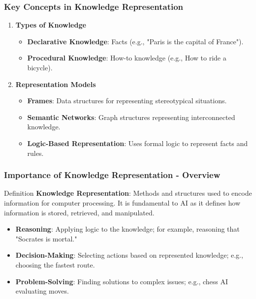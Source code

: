 \documentclass[aspectratio=169]{beamer}
\begin{document}
\begin{frame}[fragile]
    \frametitle{Key Concepts in Knowledge Representation}
    \begin{enumerate}
        \item \textbf{Types of Knowledge}
        \begin{itemize}
            \item \textbf{Declarative Knowledge}: Facts (e.g., "Paris is the capital of France").
            \item \textbf{Procedural Knowledge}: How-to knowledge (e.g., How to ride a bicycle).
        \end{itemize}
        \item \textbf{Representation Models}
        \begin{itemize}
            \item \textbf{Frames}: Data structures for representing stereotypical situations.
            \item \textbf{Semantic Networks}: Graph structures representing interconnected knowledge.
            \item \textbf{Logic-Based Representation}: Uses formal logic to represent facts and rules.
        \end{itemize}
    \end{enumerate}
\end{frame}

\begin{frame}[fragile]
    \frametitle{Importance of Knowledge Representation - Overview}
    \begin{block}{Definition}
        \textbf{Knowledge Representation}: Methods and structures used to encode information for computer processing. It is fundamental to AI as it defines how information is stored, retrieved, and manipulated.
    \end{block}
    \begin{itemize}
        \item \textbf{Reasoning}: Applying logic to the knowledge; for example, reasoning that "Socrates is mortal."
        \item \textbf{Decision-Making}: Selecting actions based on represented knowledge; e.g., choosing the fastest route.
        \item \textbf{Problem-Solving}: Finding solutions to complex issues; e.g., chess AI evaluating moves.
    \end{itemize}
\end{frame}
\end{document}
